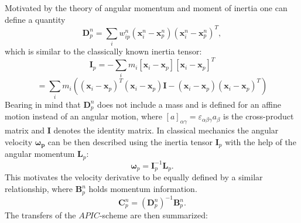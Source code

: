 \documentclass[m,times]{cgMA}
\begin{document}
Motivated by the theory of angular momentum and moment of inertia one can define a quantity
\begin{equation}
\boldsymbol { D } _ { p } ^ { n } = \sum _ { i } w _ { i p } ^ { n } ( \boldsymbol { x } _ { i } ^ { n } - \boldsymbol { x } _ { p } ^ { n } ) ( \boldsymbol { x } _ { i } ^ { n } - \boldsymbol { x } _ { p } ^ { n } ) ^ { T },
\end{equation}
which is similar to the classically known inertia tensor:
\begin{equation}
  \boldsymbol{I} _ { p } = - \sum _ { i } m _ { i } [\boldsymbol{x} _ { i }-\boldsymbol{x}_{p}][\boldsymbol{x} _ { i }-\boldsymbol{x}_{p}]^T
\end{equation}
$$
=
\sum _ { i } m _ { i }((\boldsymbol{x} _ { i }-\boldsymbol{x}_{p})^T(\boldsymbol{x} _ { i }-\boldsymbol{x}_{p})\boldsymbol{I} -(\boldsymbol{x} _ { i }-\boldsymbol{x}_{p})(\boldsymbol{x} _ { i }-\boldsymbol{x}_{p})^T)
$$
Bearing in mind that $\boldsymbol{D}_p^n$ does not include a mass and is defined for an affine motion instead of an angular motion, where $[a]_{\alpha\gamma} = \varepsilon_{\alpha\beta\gamma}a_{\beta}$ is the cross-product matrix and $\boldsymbol{I}$ denotes the identity matrix.
In classical mechanics the angular velocity $\boldsymbol{\omega_p}$ can be then described using the inertia tensor $\boldsymbol{I}_p$ with the help of the angular momentum $\boldsymbol{L}_p$:
\begin{equation}
  \boldsymbol{\omega}_p = \boldsymbol{I}_p^{-1} \boldsymbol{L}_p.
\end{equation}
This motivates the velocity derivative to be equally defined by a similar relationship, where $\boldsymbol{B}^n_p$ holds momentum information.
\begin{equation}
  \boldsymbol{C}^n_p = (\boldsymbol{D}_p^n)^{-1} \boldsymbol{B}^n_p.
\end{equation}
The transfers of the $APIC$-scheme are then summarized:
\end{document}
